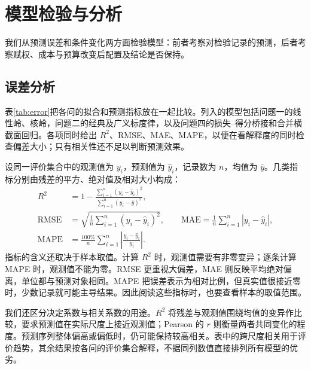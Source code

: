 \section{模型检验与分析}
\label{sec:validation}

我们从预测误差和条件变化两方面检验模型：前者考察对检验记录的预测，后者考察赋权、成本与预算改变后配置及结论是否保持。

\subsection{误差分析}
\label{sec:check}

表\ref{tab:error}把各问的拟合和预测指标放在一起比较。列入的模型包括问题一的线性岭、核岭，问题二的经典及广义标度律，以及问题四的损失--得分桥接和合并横截面回归。各项同时给出 $R^2$、RMSE、MAE、MAPE，以便在看解释度的同时检查偏差大小；只有相关性还不足以判断预测效果。

设同一评价集合中的观测值为 $y_i$，预测值为 $\hat y_i$，记录数为 $n$，均值为 $\bar y$。几类指标分别由残差的平方、绝对值及相对大小构成：
\begin{align*}
 R^2&=1-\frac{\sum_{i=1}^{n}(y_i-\hat y_i)^2}{\sum_{i=1}^{n}(y_i-\bar y)^2},\\
 \mathrm{RMSE}&=\sqrt{\frac{1}{n}\sum_{i=1}^{n}(y_i-\hat y_i)^2},\qquad
 \mathrm{MAE}=\frac{1}{n}\sum_{i=1}^{n}|y_i-\hat y_i|,\\
 \mathrm{MAPE}&=\frac{100\%}{n}\sum_{i=1}^{n}\left|\frac{y_i-\hat y_i}{y_i}\right|.
\end{align*}
指标的含义还取决于样本取值。计算 $R^2$ 时，观测值需要有非零变异；逐条计算 MAPE 时，观测值不能为零。RMSE 更重视大偏差，MAE 则反映平均绝对偏离，单位都与预测对象相同。MAPE 把误差表示为相对比例，但真实值很接近零时，少数记录就可能主导结果。因此阅读这些指标时，也要查看样本的取值范围。

我们还区分决定系数与相关系数的用途。$R^2$ 将残差与观测值围绕均值的变异作比较，要求预测值在实际尺度上接近观测值；Pearson 的 $r$ 则衡量两者共同变化的程度。预测序列整体偏高或偏低时，仍可能保持较高相关。表中的跨尺度相关用于评价趋势，其余结果按各问的评价集合解释，不据同列数值直接排列所有模型的优劣。

